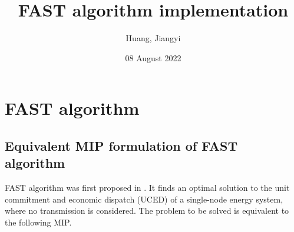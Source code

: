 \documentclass{article}
\title{FAST algorithm implementation}
\author{Huang, Jiangyi}
\date{08 August 2022}
\begin{document}
\maketitle

\section{FAST algorithm}

\subsection{Equivalent MIP formulation of FAST algorithm}
FAST algorithm was first proposed in \cite{Aonghus2014_FAST}. It finds an optimal solution to the unit commitment and economic dispatch (UCED) of a single-node energy system, where no transmission is considered. The problem to be solved is equivalent to the following MIP. 
\end{document}
